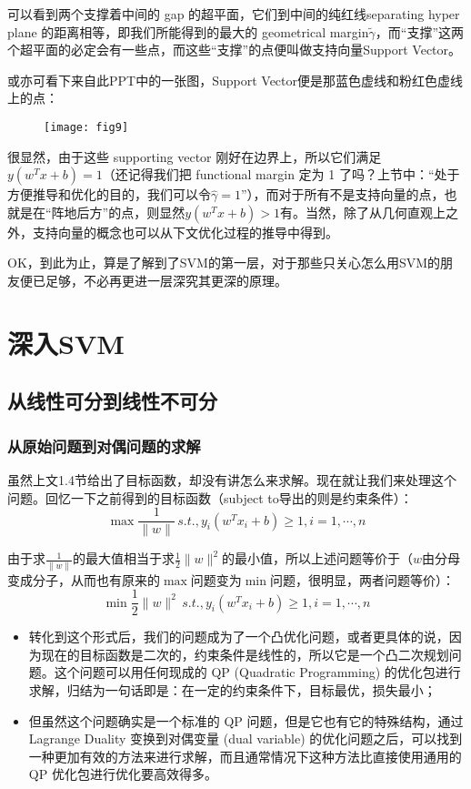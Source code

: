 \documentclass[a4paper,12pt]{article}
\begin{document}
可以看到两个支撑着中间的 gap 的超平面，它们到中间的纯红线separating hyper plane 的距离相等，即我们所能得到的最大的 geometrical margin$\widetilde{\gamma}$，而“支撑”这两个超平面的必定会有一些点，而这些“支撑”的点便叫做支持向量Support Vector。

或亦可看下来自此PPT中的一张图，Support Vector便是那蓝色虚线和粉红色虚线上的点：

\begin{figure}[H]
  \centering
  \texttt{[image: fig9]}
\end{figure}

很显然，由于这些 supporting vector 刚好在边界上，所以它们满足$y(w^Tx+b)=1$（还记得我们把 functional margin 定为 1 了吗？上节中：“处于方便推导和优化的目的，我们可以令$\widehat{\gamma}=1$”），而对于所有不是支持向量的点，也就是在“阵地后方”的点，则显然$y(w^Tx+b)>1$有。当然，除了从几何直观上之外，支持向量的概念也可以从下文优化过程的推导中得到。

OK，到此为止，算是了解到了SVM的第一层，对于那些只关心怎么用SVM的朋友便已足够，不必再更进一层深究其更深的原理。

\section{深入SVM}
\subsection{从线性可分到线性不可分}
\subsubsection{从原始问题到对偶问题的求解}
虽然上文1.4节给出了目标函数，却没有讲怎么来求解。现在就让我们来处理这个问题。回忆一下之前得到的目标函数（subject to导出的则是约束条件）：
\begin{equation}
  \max\frac{1}{\|w\|}\,s.t.,y_i(w^Tx_i+b)\geq1,i=1,\cdots,n
\end{equation}

由于求$\frac{1}{\|w\|}$的最大值相当于求$\frac{1}{2}\|w\|^2$的最小值，所以上述问题等价于（$w$由分母变成分子，从而也有原来的$\max$问题变为$\min$问题，很明显，两者问题等价）：
\begin{equation}
  \min\frac{1}{2}\|w\|^2\,s.t.,y_i(w^Tx_i+b)\geq1,i=1,\cdots,n
\end{equation}
\begin{itemize}
\item 转化到这个形式后，我们的问题成为了一个凸优化问题，或者更具体的说，因为现在的目标函数是二次的，约束条件是线性的，所以它是一个凸二次规划问题。这个问题可以用任何现成的 QP (Quadratic Programming) 的优化包进行求解，归结为一句话即是：在一定的约束条件下，目标最优，损失最小；
\item 但虽然这个问题确实是一个标准的 QP 问题，但是它也有它的特殊结构，通过 Lagrange Duality 变换到对偶变量 (dual variable) 的优化问题之后，可以找到一种更加有效的方法来进行求解，而且通常情况下这种方法比直接使用通用的 QP 优化包进行优化要高效得多。
\end{itemize}
\end{document}

